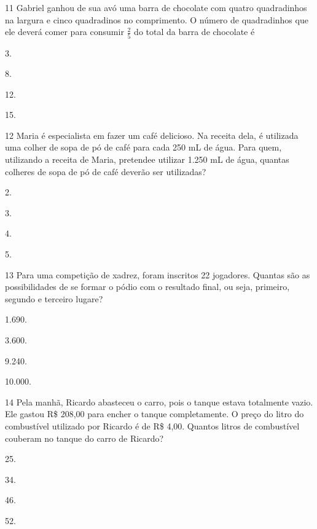 \num{11} Gabriel ganhou de sua avó uma barra de chocolate com quatro quadradinhos na largura e cinco quadradinos no comprimento.
O número de quadradinhos que ele deverá comer para consumir $\frac{2}{5}$ do total
da barra de chocolate é

\begin{multicols}{2}
\begin{escolha}
\item
  3.
\item
  8.
\item
  12.
\item
  15.
\end{escolha}
\end{multicols}

\num{12} Maria é especialista em fazer um café delicioso. Na receita dela, é utilizada uma colher de sopa de pó de café para cada 250 mL
de água. Para quem, utilizando a receita de Maria, pretendee utilizar 1.250
mL de água, quantas colheres de sopa de pó de café deverão ser utilizadas?

\begin{multicols}{2}
\begin{escolha}
\item
  2.
\item
  3.
\item
  4.
\item
  5.
\end{escolha}
\end{multicols}


\num{13} Para uma competição de xadrez, foram inscritos 22 jogadores. Quantas são
as possibilidades de se formar o pódio com o resultado final, ou seja,
primeiro, segundo e terceiro lugare?

\begin{multicols}{2}
\begin{escolha}
\item
  1.690.
\item
  3.600.
\item
  9.240.
\item
  10.000.
\end{escolha}
\end{multicols}

\num{14} Pela manhã, Ricardo abasteceu o carro, pois o tanque estava totalmente
vazio. Ele gastou R\$ 208,00 para encher o tanque completamente.
O preço do litro do combustível utilizado por Ricardo
é de R\$ 4,00. Quantos litros de combustível couberam no tanque do carro de
Ricardo?

\begin{multicols}{2}
\begin{escolha}
\item
  25.
\item
  34.
\item
  46.
\item
  52.
\end{escolha}
\end{multicols}

